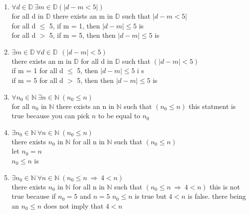 \documentclass[11pt,twoside]{amsart}
\begin{document}
\begin{enumerate}[1)]
  \item
    $\forall d \in \mathbb{D} \ \exists m \in \mathbb{D} (|d-m <5|)$ \\
    for all d in $\mathbb{D}$ there exists an m in $ \mathbb{D}$ such that $|d - m <5|$ \\
    for all d $\leq$ 5, if m = 1, then $|d-m| \leq 5$ is  \\
    for all d $>$ 5, if m = 5, then then $|d-m| \leq 5$ is 
  
    \bigskip
  \item
    $\exists m \in \mathbb{D} \ \forall d \in \mathbb{D} \  \ (| d - m | < 5)$ \\
    there exists an m in $\mathbb{D}$ for all d in $\mathbb{D}$ such that $(|d-m| <5)$\\ 
    if m = 1 for all d $\leq$ 5, then $|d-m| \leq 5$ i    s  \\
    if m = 5 for all d $>$ 5, then then $|d-m| \leq 5$     is 

    \bigskip
  \item
    $\forall n_0 \in \mathbb{N} \ \exists n \in \mathbb{N} \  (n_0  \leq n)$ \\
    for all $n_0$ in $\mathbb{N}$ there exists an n in $\mathbb{N}$ such that $(n_0 \leq n)$
    this statment is true because you can pick $n$ to be equal to $n_0$ 

    \bigskip
  \item
    $\exists n_0 \in \mathbb{N} \ \forall n \in \mathbb{N} \  (n_0 \leq n)$ \\
    there exists $n_0$ in $\mathbb{N}$ for all n in $\mathbb{N}$ such that $(n_0 \leq n)$\\
    let $n_0 = n$ \\
    $n_0 \leq n$ is 
    \bigskip
  \item
    $\exists n_0 \in \mathbb{N} \ \forall n \in \mathbb{N} \ ( n_0 \leq n \ \Rightarrow \ 4<n)$ \\
    there exists $n_0$ in $\mathbb{N}$ for all n in $\mathbb{N}$ such that $( n_0 \leq n \ \Rightarrow \ 4<n)$
    this is not true because if $n_0 = 5$ and $n = 5$ 
    $n_0 \leq n$ is true but $4 < n$ is false. there being an $n_0 \leq n$ does not imply that $4 < n$
    

    \bigskip
\end{enumerate}
\end{document}
